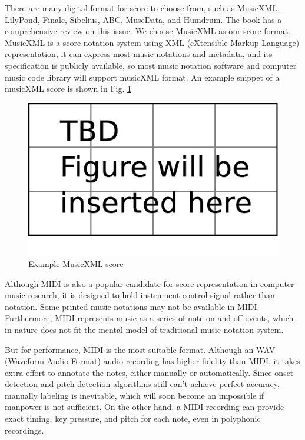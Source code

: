 There are many digital format for score to choose from, such as MusicXML\cite{Good2001}, LilyPond\cite{LilyPond}, Finale, Sibelius, ABC, MuseData, and Humdrum. The book \cite{Selfridge-Field1997} has a comprehensive review on this issue. %
We choose MusicXML as our score format. MusicXML is a score notation system using XML (eXtensible Markup Language) representation, it can express most music notations and metadata, and its specification is publicly available, so most music notation software and computer music code library will support musicXML format. An example snippet of a musicXML score is shown in Fig. \ref{fig:expxml}%
\begin{figure}[tp]
   \begin{center}
      \includegraphics[width=\textwidth]{fig/TBDFigure}

   \end{center}
   \caption{Example MusicXML score}
   \label{fig:expxml}
\end{figure}
Although MIDI is also a popular candidate for score representation in computer music research, it is designed to hold instrument control signal rather than notation. Some printed music notations may not be available in MIDI.  Furthermore, MIDI represents music as a series of note on and off events, which in nature does not fit the mental model of traditional music notation system.

But for performance, MIDI is the most suitable format.
Although an WAV (Waveform Audio Format) audio recording has higher fidelity than MIDI, it takes extra effort to annotate the notes, either manually or automatically. Since onset detection and pitch detection algorithms still can't achieve perfect accuracy, manually labeling is inevitable, which will soon become an impossible if manpower is not sufficient. On the other hand, a MIDI recording can provide exact timing, key pressure, and pitch for each note, even in polyphonic recordings. 

